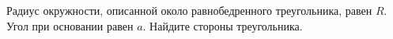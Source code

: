 \begin{ex}
	\begin{condition}
		Радиус окружности, описанной около равнобедренного треугольника, равен \( R \). Угол при основании равен \( a \). Найдите стороны треугольника.
	\end{condition}
\end{ex}